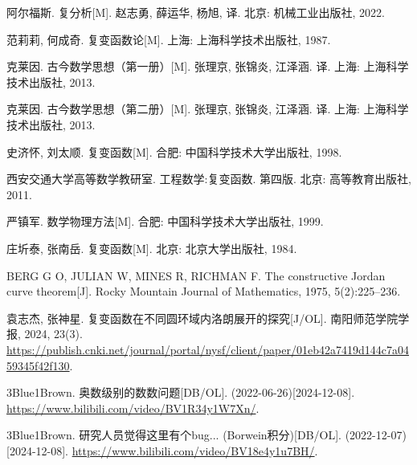 \begin{thebibliography}{99}
	阿尔福斯.
	复分析[M].
	赵志勇, 薛运华, 杨旭, 译.
	北京: 机械工业出版社, 2022.

	范莉莉, 何成奇.
	复变函数论[M].
	上海: 上海科学技术出版社, 1987.

	克莱因.
	古今数学思想（第一册）[M].
	张理京, 张锦炎, 江泽涵. 译.
	上海: 上海科学技术出版社, 2013.

	克莱因.
	古今数学思想（第二册）[M].
	张理京, 张锦炎, 江泽涵. 译.
	上海: 上海科学技术出版社, 2013.
	
	史济怀, 刘太顺.
	复变函数[M].
	合肥: 中国科学技术大学出版社, 1998.
	
	西安交通大学高等数学教研室.
	工程数学:复变函数.
	第四版.
	北京: 高等教育出版社, 2011.

	严镇军.
	数学物理方法[M].
	合肥: 中国科学技术大学出版社, 1999.

	庄圻泰, 张南岳.
	复变函数[M].
	北京: 北京大学出版社, 1984.

	BERG G O, JULIAN W, MINES R, RICHMAN F.
	The constructive Jordan curve theorem[J].
	Rocky Mountain Journal of Mathematics, 1975, 5(2):225--236.

	袁志杰, 张神星.
	复变函数在不同圆环域内洛朗展开的探究[J/OL].
	南阳师范学院学报, 2024, 23(3).
	\url{https://publish.cnki.net/journal/portal/nysf/client/paper/01eb42a7419d144c7a0459345f42f130}.

	3Blue1Brown.
	奥数级别的数数问题[DB/OL].
	(2022-06-26)[2024-12-08].
	\url{https://www.bilibili.com/video/BV1R34y1W7Xn/}.

	3Blue1Brown.
	研究人员觉得这里有个bug... (Borwein积分)[DB/OL].
	(2022-12-07)[2024-12-08].
	\url{https://www.bilibili.com/video/BV18e4y1u7BH/}.


\end{thebibliography}
